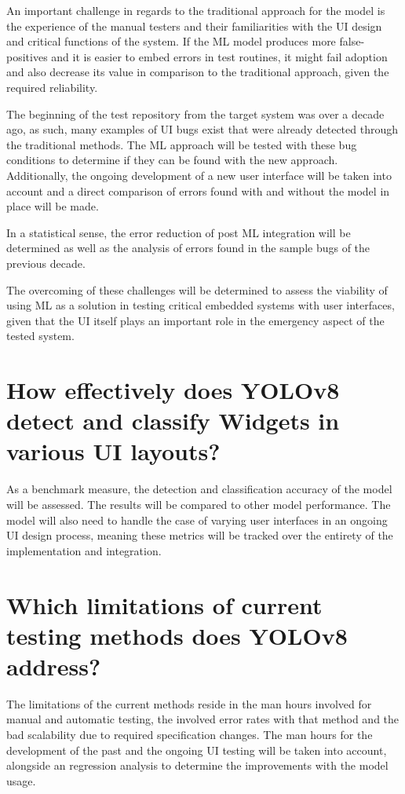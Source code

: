 \documentclass[Proposal,BIC,english,IEEE]{BASE/twbook} %
\begin{document}
An important challenge in regards to the traditional approach for the model is the experience of the manual testers and their familiarities with the UI design and critical functions of the system.
If the ML model produces more false-positives and it is easier to embed errors in test routines, it might fail adoption and also decrease its value in comparison to the traditional approach, given the required reliability.

The beginning of the test repository from the target system was over a decade ago, as such, many examples of UI bugs exist that were already detected through the traditional methods.
The ML approach will be tested with these bug conditions to determine if they can be found with the new approach. Additionally, the ongoing development of a new user interface will be taken into account and a direct comparison of errors found with and without the model in place will be made.

In a statistical sense, the error reduction of post ML integration will be determined as well as the analysis of errors found in the sample bugs of the previous decade.

The overcoming of these challenges will be determined to assess the viability of using ML as a solution in testing critical embedded systems with user interfaces, given that the UI itself plays an important role in the emergency aspect of the tested system.

\section{How effectively does YOLOv8 detect and classify Widgets in various UI layouts?}
As a benchmark measure, the detection and classification accuracy of the model will be assessed. The results will be compared to other model performance.
The model will also need to handle the case of varying user interfaces in an ongoing UI design process, meaning these metrics will be tracked over the entirety of the implementation and integration.

\section{Which limitations of current testing methods does YOLOv8 address?}
The limitations of the current methods reside in the man hours involved for manual and automatic testing, the involved error rates with that method and the bad scalability due to required specification changes.
The man hours for the development of the past and the ongoing UI testing will be taken into account, alongside an regression analysis to determine the improvements with the model usage.
\newpage
\end{document}
